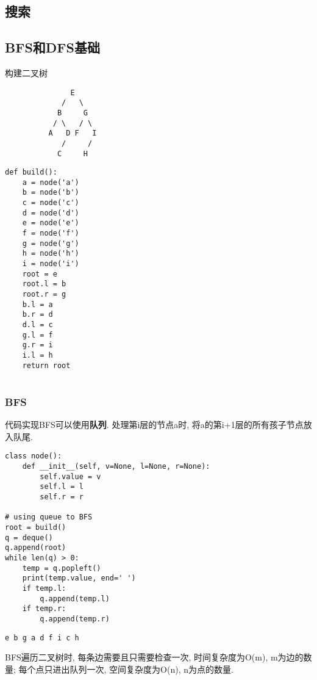 \documentclass[../main]{subfiles}
\begin{document}
\begin{sloppy}

\section{搜索}

\subsection{BFS和DFS基础}

    构建二叉树
    \begin{verbatim}
               E
             /   \
            B     G
           / \   / \
          A   D F   I
             /     /
            C     H
    \end{verbatim}

\begin{lstlisting}[style = Python]
def build():
    a = node('a')
    b = node('b')
    c = node('c')
    d = node('d')
    e = node('e')
    f = node('f')
    g = node('g')
    h = node('h')
    i = node('i')
    root = e
    root.l = b
    root.r = g
    b.l = a
    b.r = d
    d.l = c
    g.l = f
    g.r = i
    i.l = h
    return root
    
\end{lstlisting}
    
    \subsubsection{BFS}

        代码实现BFS可以使用\textbf{队列}. 处理第i层的节点a时, 将a的第i+1层的所有孩子节点放入队尾.

\begin{lstlisting}[style = Python]
class node():
    def __init__(self, v=None, l=None, r=None):
        self.value = v
        self.l = l
        self.r = r

# using queue to BFS
root = build()
q = deque()
q.append(root)
while len(q) > 0:
    temp = q.popleft()
    print(temp.value, end=' ')
    if temp.l:
        q.append(temp.l)
    if temp.r:
        q.append(temp.r)

\end{lstlisting}
    
\begin{verbatim}
e b g a d f i c h
\end{verbatim}

        BFS遍历二叉树时, 每条边需要且只需要检查一次, 时间复杂度为O(m), m为边的数量; 每个点只进出队列一次, 空间复杂度为O(n), n为点的数量.


\end{sloppy}
\end{document}
